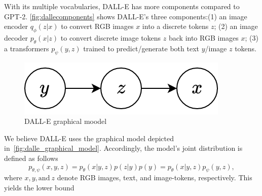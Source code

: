 \documentclass{article}
\begin{document}
	With its multiple vocabularies, DALL-E has more components compared to GPT-2. \autoref{fig:dallecomponents} shows DALL-E's three components:(1) an image encoder $q_\phi({z|x})$ to convert RGB images $x$ into a discrete tokens $z$; (2) an image decoder $p_\theta({x|z})$ to convert discrete image tokens $z$  back into RGB images $x$; (3) a transformers $p_{\psi}(y,z)$ trained to predict/generate both text $y$/image $z$ tokens.
	
	
	\begin{figure}[h]
		\centering
		\includegraphics[width=0.3\linewidth]{dalle_graphical_model}
		\caption{DALL-E graphical moodel}
		\label{fig:dalle_graphical_model}
	\end{figure}

	We believe DALL-E uses the graphical model depicted in~\autoref{fig:dalle_graphical_model}. Accordingly, the model's joint distribution is defined as follows
	\begin{equation}
			p_{\theta,\psi}(x,y,z) = p_{\theta}(x|y,z) p(z|y) p(y) =  p_{\theta}(x|y,z) p_{\psi}(y,z),
	\end{equation} 
	where $x, y, \text{and}\ z$ denote RGB images, text, and image-tokens, respectively. This yields the lower bound
	
	

	
	
	

	
	
\end{document}
